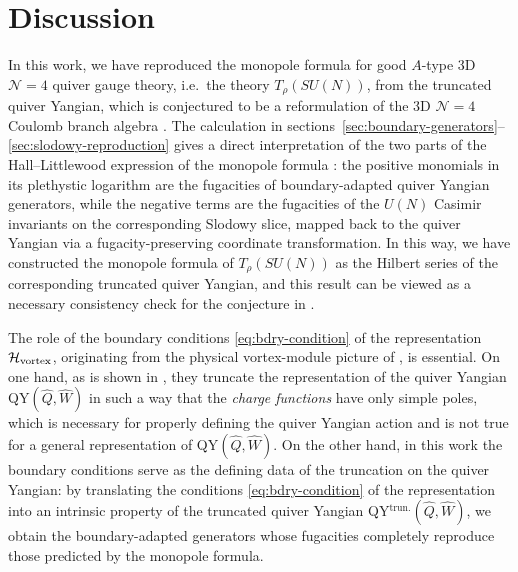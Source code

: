 \documentclass[12pt,a4paper]{article}
\begin{document}
 \section{Discussion}
\label{sec:discussion}

In this work, we have reproduced the monopole formula \cite{CremonesiHananyZaffaroni2014,CremonesiEtAl2014} for good $A$-type 3D $\mathcal N=4$ quiver gauge theory, i.e.\ the theory $T_\rho(SU(N))$, from the truncated quiver Yangian, which is conjectured to be a reformulation of the 3D $\mathcal N=4$ Coulomb branch algebra \cite{ChenLi2026}. 
The calculation in sections~\ref{sec:boundary-generators}--\ref{sec:slodowy-reproduction} gives a direct interpretation of the two parts of the Hall--Littlewood expression of the monopole formula \cite{CremonesiEtAl2014}:  the positive monomials in its plethystic logarithm are the fugacities of boundary-adapted quiver Yangian generators, while the negative terms are the fugacities of the $U(N)$ Casimir invariants on the corresponding Slodowy slice, mapped back to the quiver Yangian via a fugacity-preserving coordinate transformation.  In this way, we have constructed the monopole formula of $T_\rho(SU(N))$ as the Hilbert series of the corresponding truncated quiver Yangian, and this result can be viewed as a necessary consistency check for the conjecture in \cite{ChenLi2026}.


The role of the boundary conditions \eqref{eq:bdry-condition} of the representation $\mathcal H_{\rm vortex}$,  originating from the physical vortex-module picture of \cite{BullimoreEtAl2018,HananyTong2003,EtoEtAl2006,EtoEtAlReview2006}, is essential. On one hand, as is shown in \cite{ChenLi2026}, they truncate the representation of the quiver Yangian QY$(\hat Q,\hat W)$ in such a way that the \textit{charge functions} have only simple poles, which is necessary for properly defining the quiver Yangian action and is not true for a general representation of QY$(\hat Q,\hat W)$. 
On the other hand, in this work the boundary conditions serve as the defining data of the truncation on the quiver Yangian: by translating the conditions \eqref{eq:bdry-condition} of the representation into an intrinsic property of the truncated quiver Yangian  QY$^{\text{trun.}}(\hat Q,\hat W)$, we obtain the boundary-adapted generators  whose fugacities completely reproduce those predicted by the monopole formula.
\end{document}
